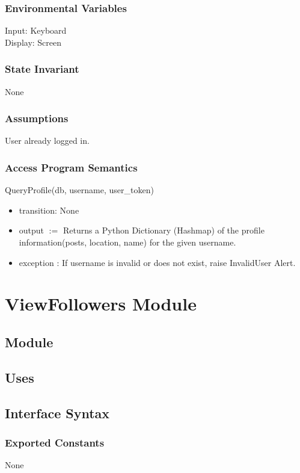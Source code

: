 \documentclass[12pt, titlepage]{article}
\begin{document}
\subsubsection{Environmental Variables}
Input: Keyboard\\
Display: Screen


\subsubsection{State Invariant}
None

\subsubsection{Assumptions}
User already logged in.

\subsubsection{Access Program Semantics}
QueryProfile(db, username, user\_token)
\begin{itemize}
    \item transition: None
    \item output $:= $ Returns a Python Dictionary (Hashmap) of the profile information(posts, location, name) for the given username.
    \item exception : If username is invalid or does not exist, raise InvalidUser Alert.
\end{itemize}






\newpage
\section* {ViewFollowers Module}

\subsection*{Module}

\subsection* {Uses}


\subsection* {Interface Syntax}
\subsubsection* {Exported Constants}
None
\end{document}
